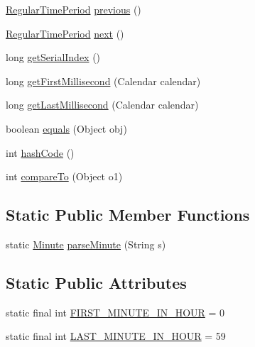 \begin{DoxyCompactItemize}
\item 
\mbox{\hyperlink{classorg_1_1jfree_1_1data_1_1time_1_1_regular_time_period}{Regular\+Time\+Period}} \mbox{\hyperlink{classorg_1_1jfree_1_1data_1_1time_1_1_minute_ad15d8cb2c01781598f3675e7d57f801e}{previous}} ()
\item 
\mbox{\hyperlink{classorg_1_1jfree_1_1data_1_1time_1_1_regular_time_period}{Regular\+Time\+Period}} \mbox{\hyperlink{classorg_1_1jfree_1_1data_1_1time_1_1_minute_a6213ef85da8a4184b72edfe5d26a9e39}{next}} ()
\item 
long \mbox{\hyperlink{classorg_1_1jfree_1_1data_1_1time_1_1_minute_ae8cff727e9675fca26364ceccefe57b7}{get\+Serial\+Index}} ()
\item 
long \mbox{\hyperlink{classorg_1_1jfree_1_1data_1_1time_1_1_minute_a8a3fb56ae6d437414bfa31873a229327}{get\+First\+Millisecond}} (Calendar calendar)
\item 
long \mbox{\hyperlink{classorg_1_1jfree_1_1data_1_1time_1_1_minute_a8c46d7794fe371defd6eae869807a7b8}{get\+Last\+Millisecond}} (Calendar calendar)
\item 
boolean \mbox{\hyperlink{classorg_1_1jfree_1_1data_1_1time_1_1_minute_a97bfcf2b86465b2ab88cf1d709c2753b}{equals}} (Object obj)
\item 
int \mbox{\hyperlink{classorg_1_1jfree_1_1data_1_1time_1_1_minute_a6365f935f1dddbd458249bfa08ff02f3}{hash\+Code}} ()
\item 
int \mbox{\hyperlink{classorg_1_1jfree_1_1data_1_1time_1_1_minute_ae82d4e55d9af40f06633cf78e8890ec3}{compare\+To}} (Object o1)
\end{DoxyCompactItemize}
\subsection*{Static Public Member Functions}
\begin{DoxyCompactItemize}
\item 
static \mbox{\hyperlink{classorg_1_1jfree_1_1data_1_1time_1_1_minute}{Minute}} \mbox{\hyperlink{classorg_1_1jfree_1_1data_1_1time_1_1_minute_aef2f7b4032621c25bed43347ac34c1cc}{parse\+Minute}} (String s)
\end{DoxyCompactItemize}
\subsection*{Static Public Attributes}
\begin{DoxyCompactItemize}
\item 
static final int \mbox{\hyperlink{classorg_1_1jfree_1_1data_1_1time_1_1_minute_a858e2e398b9a67fdd5e3c91d6e74dc4e}{F\+I\+R\+S\+T\+\_\+\+M\+I\+N\+U\+T\+E\+\_\+\+I\+N\+\_\+\+H\+O\+UR}} = 0
\item 
static final int \mbox{\hyperlink{classorg_1_1jfree_1_1data_1_1time_1_1_minute_aba2476db31e4a1b8aecbb439d9e04d5a}{L\+A\+S\+T\+\_\+\+M\+I\+N\+U\+T\+E\+\_\+\+I\+N\+\_\+\+H\+O\+UR}} = 59
\end{DoxyCompactItemize}


